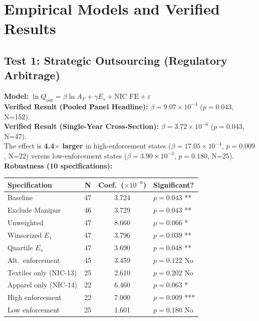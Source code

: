 \documentclass[11pt]{article}
\begin{document}
	\section{Empirical Models and Verified Results}
	
	\subsection{Test 1: Strategic Outsourcing (Regulatory Arbitrage)}
	\textbf{Model:} $\ln Q_{\text{out}} = \beta \ln A_{F} + \gamma E_s + \text{NIC FE} + \varepsilon$ \\
	\textbf{Verified Result (Pooled Panel Headline):} $\beta = 9.07 \times 10^{-4}$ ($p=0.043$, N=152). \\
	\textbf{Verified Result (Single-Year Cross-Section):} $\beta = 3.72 \times 10^{-6}$ ($p=0.043$, N=47). \\
	The effect is \textbf{4.4$\times$ larger} in high-enforcement states ($\beta = 17.05 \times 10^{-4}$, $p=0.009$, N=22) versus low-enforcement states ($\beta = 3.90 \times 10^{-4}$, $p=0.180$, N=25). \\[4pt]
	\textbf{Robustness (10 specifications):}
	\begin{center}
		\begin{tabular}{lccl}
			\toprule
			Specification & N & Coef.\ ($\times 10^{-6}$) & Significant? \\
			\midrule
			Baseline & 47 & 3.724 & $p=0.043$ ** \\
			Exclude Manipur & 46 & 3.729 & $p=0.043$ ** \\
			Unweighted & 47 & 8.660 & $p=0.066$ * \\
			Winsorized $E_s$ & 47 & 3.796 & $p=0.039$ ** \\
			Quartile $E_s$ & 47 & 3.690 & $p=0.048$ ** \\
			Alt.\ enforcement & 45 & 3.459 & $p=0.122$ No \\
			Textiles only (NIC-13) & 25 & 2.610 & $p=0.202$ No \\
			Apparel only (NIC-14) & 22 & 6.460 & $p=0.063$ * \\
			High enforcement & 22 & 7.000 & $p=0.009$ *** \\
			Low enforcement & 25 & 1.601 & $p=0.180$ No \\
			\bottomrule
		\end{tabular}
	\end{center}
\end{document}

